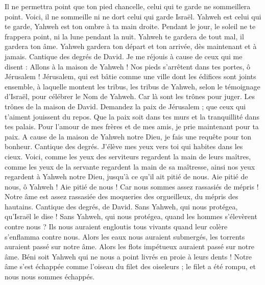 \begin{multicols}{2}
Il ne permettra point que ton pied chancelle, celui qui te garde ne sommeillera point.
Voici, il ne sommeille ni ne dort celui qui garde Israël.
Yahweh est celui qui te garde, Yahweh est ton ombre à ta main droite.
Pendant le jour, le soleil ne te frappera point, ni la lune pendant la nuit.
Yahweh te gardera de tout mal, il gardera ton âme.
Yahweh gardera ton départ et ton arrivée, dès maintenant et à jamais.
\VerseOne{}Cantique des degrés de David. Je me réjouis à cause de ceux qui me disent : Allons à la maison de Yahweh !
Nos pieds s’arrêtent dans tes portes, ô Jérusalem !
Jérusalem, qui est bâtie comme une ville dont les édifices sont joints ensemble,
à laquelle montent les tribus, les tribus de Yahweh, selon le témoignage d’Israël, pour célébrer le Nom de Yahweh.
Car là sont les trônes pour juger. Les trônes de la maison de David.
Demandez la paix de Jérusalem ; que ceux qui t'aiment jouissent du repos.
Que la paix soit dans tes murs et la tranquillité dans tes palais.
Pour l'amour de mes frères et de mes amis, je prie maintenant pour ta paix.
A cause de la maison de Yahweh notre Dieu, je fais une requête pour ton bonheur.
\VerseOne{}Cantique des degrés. J'élève mes yeux vers toi qui habites dans les cieux.
Voici, comme les yeux des serviteurs regardent la main de leurs maîtres, comme les yeux de la servante regardent la main de sa maîtresse, ainsi nos yeux regardent à Yahweh notre Dieu, jusqu’à ce qu'il ait pitié de nous.
Aie pitié de nous, ô Yahweh ! Aie pitié de nous ! Car nous sommes assez rassasiés de mépris !
Notre âme est assez rassasiée des moqueries des orgueilleux, du mépris des hautains.
\VerseOne{}Cantique des degrés, de David. Sans Yahweh, qui nous protégea, qu’Israël le dise !
Sans Yahweh, qui nous protégea, quand les hommes s’élevèrent contre nous ?
Ils nous auraient engloutis tous vivants quand leur colère s’enflamma contre nous.
Alors les eaux nous auraient submergés, les torrents auraient passé sur notre âme.
Alors les flots impétueux auraient passé sur notre âme.
Béni soit Yahweh qui ne nous a point livrés en proie à leurs dents !
Notre âme s’est échappée comme l'oiseau du filet des oiseleurs ; le filet a été rompu, et nous nous sommes échappés.

\end{multicols}
